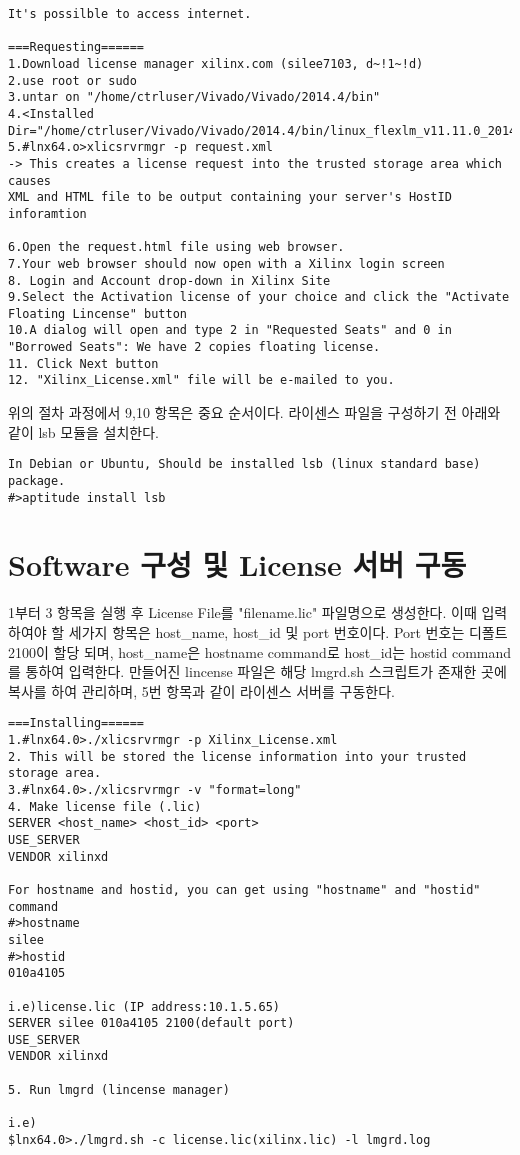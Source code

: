 \documentclass[11pt
  , a4paper
  , article
  , oneside
]{memoir}
\begin{document}
\begin{lstlisting}[style=termstyle, escapechar=!]
It's possilble to access internet.

===Requesting======
1.Download license manager xilinx.com (silee7103, d~!1~!d)
2.use root or sudo
3.untar on "/home/ctrluser/Vivado/Vivado/2014.4/bin"
4.<Installed Dir="/home/ctrluser/Vivado/Vivado/2014.4/bin/linux_flexlm_v11.11.0_201410">/lnx64.o/install_fnp.sh
5.#lnx64.o>xlicsrvrmgr -p request.xml
-> This creates a license request into the trusted storage area which causes
XML and HTML file to be output containing your server's HostID inforamtion

6.Open the request.html file using web browser.
7.Your web browser should now open with a Xilinx login screen
8. Login and Account drop-down in Xilinx Site
9.Select the Activation license of your choice and click the "Activate Floating Lincense" button
10.A dialog will open and type 2 in "Requested Seats" and 0 in "Borrowed Seats": We have 2 copies floating license.
11. Click Next button
12. "Xilinx_License.xml" file will be e-mailed to you.
\end{lstlisting}

위의 절차 과정에서 9,10 항목은 중요 순서이다. 라이센스 파일을 구성하기 전 아래와 같이 lsb 모듈을 설치한다.

\begin{lstlisting}[style=termstyle, escapechar=!]
In Debian or Ubuntu, Should be installed lsb (linux standard base) package.
#>aptitude install lsb
\end{lstlisting}


\chapter{Software 구성 및 License 서버 구동}
1부터 3 항목을 실행 후 License File를 "filename.lic" 파일명으로 생성한다. 이때 입력하여야 할 세가지 항목은 host\_name, host\_id 및 port 번호이다. Port 번호는 디폴트 2100이 할당 되며, host\_name은 hostname command로 host\_id는 hostid command를 통하여 입력한다. 만들어진 lincense 파일은 해당 lmgrd.sh 스크립트가 존재한 곳에 복사를 하여 관리하며, 5번 항목과 같이 라이센스 서버를 구동한다. 
\begin{lstlisting}[style=termstyle, escapechar=!]
===Installing======
1.#lnx64.0>./xlicsrvrmgr -p Xilinx_License.xml
2. This will be stored the license information into your trusted storage area.
3.#lnx64.0>./xlicsrvrmgr -v "format=long"
4. Make license file (.lic)
SERVER <host_name> <host_id> <port>
USE_SERVER
VENDOR xilinxd

For hostname and hostid, you can get using "hostname" and "hostid" command
#>hostname
silee
#>hostid
010a4105

i.e)license.lic (IP address:10.1.5.65)
SERVER silee 010a4105 2100(default port)
USE_SERVER
VENDOR xilinxd

5. Run lmgrd (lincense manager)

i.e)
$lnx64.0>./lmgrd.sh -c license.lic(xilinx.lic) -l lmgrd.log
\end{lstlisting}
\end{document}
